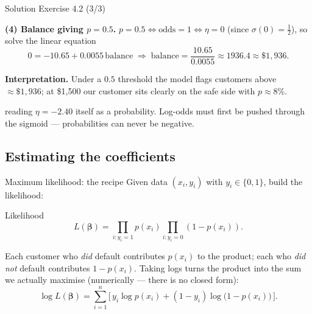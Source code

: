 \documentclass[aspectratio=169,11pt]{beamer}
\begin{document}
\begin{frame}{Solution \textemdash{} Exercise 4.2 (3/3)}
\begin{solutionbox}
\textbf{(4) Balance giving $p=0.5$.}
$p=0.5 \iff \text{odds}=1 \iff \eta=0$ (since $\sigma(0)=\tfrac12$), so
solve the linear equation
\[
  0 = -10.65 + 0.0055\,\text{balance}
  \;\Longrightarrow\;
  \text{balance} = \frac{10.65}{0.0055} \approx 1936.4 \approx \$1{,}936 .
\]

\textbf{Interpretation.} Under a $0.5$ threshold the model flags
customers above $\approx\$1{,}936$; at \$1{,}500 our customer sits
clearly on the safe side with $p\approx 8\%$.
\end{solutionbox}
\begin{mistake}
reading $\eta=-2.40$ itself as a probability.
Log-odds must first be pushed through the sigmoid --- probabilities can
never be negative.
\end{mistake}
\end{frame}

\subsection{Estimating the coefficients}

\begin{frame}{Maximum likelihood: the recipe}
  Given data $(x_i, y_i)$ with $y_i \in \{0, 1\}$, build the
  likelihood:
  \begin{block}{Likelihood}
    \[
      L(\boldsymbol\beta) = \prod_{i: y_i = 1} p(x_i)
                            \prod_{i: y_i = 0} (1 - p(x_i)).
    \]
  \end{block}
  \begin{readme}
    Each customer who \emph{did} default contributes $p(x_i)$ to the
    product; each who \emph{did not} default contributes
    $1 - p(x_i)$. Taking logs turns the product into the sum we actually
    maximise (numerically --- there is no closed form):
    \[
      \log L(\boldsymbol\beta) = \sum_{i=1}^{n}
        \Big[\, y_i \log p(x_i) + (1 - y_i)\log\!\big(1 - p(x_i)\big)\,\Big].
    \]
  \end{readme}
\end{frame}
\end{document}

